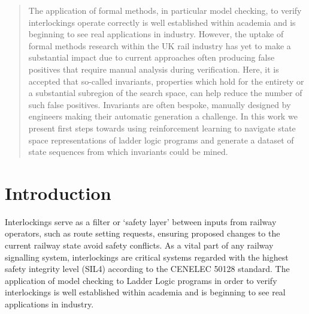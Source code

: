 \documentclass[conference,compsoc]{IEEEtran}
\begin{document}
\listoftodos


\maketitle


\begin{abstract}
The application of formal methods, in particular model checking, to verify interlockings operate correctly is well established within academia and is beginning to see real applications in industry. However, the uptake of formal methods research within the UK rail industry has yet to make a substantial impact due to current approaches often producing false positives that require manual analysis during verification. Here, it is accepted that so-called invariants, properties which hold for the entirety or a substantial subregion of the search space, can help reduce the number of such false positives. Invariants are often bespoke, manually designed by engineers making their automatic generation a challenge. In this work we present first steps towards using reinforcement learning to navigate state space representations of ladder logic programs and generate a dataset of state sequences from which invariants could be mined.
\end{abstract}



%
\IEEEpeerreviewmaketitle



\section{Introduction}

Interlockings serve as a filter or ‘safety layer’ between inputs from railway operators, such as route setting requests, ensuring proposed changes to the current railway state avoid safety conflicts. As a vital part of any railway signalling system, interlockings are critical systems regarded with the highest safety integrity level
(SIL4) according to the CENELEC 50128 standard. The application of model checking
to Ladder Logic programs in order to verify interlockings is well established within
academia and is beginning to see real applications in industry.  
\end{document}

